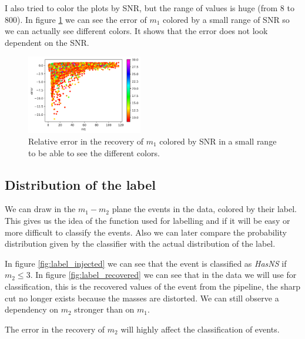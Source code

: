 \documentclass[prd,aps,twocolumn,a4paper,showkeys,nofootinbib]{revtex4-2}
\begin{document}
I also tried to color the plots by SNR, but the range of values is huge (from 8 to 800). In figure \ref{fig:relative_snr} we can see the error of $m_1$ colored by a small range of SNR so we can actually see different colors. It shows that the error does not look dependent on the SNR.

\begin{figure}[]
  \center
  \includegraphics[width=0.45\textwidth]{./FigNS/example_snr}
  \caption{\label{fig:relative_snr} Relative error in the recovery of $m_1$ colored by SNR in a small range to be able to see the different colors.}
\end{figure}

\subsection{Distribution of the label}
We can draw in the $m_1-m_2$ plane the events in the data, colored by their label. This gives us the idea of the function used for labelling and if it will be easy or more difficult to classify the events. Also we can later compare the probability distribution given by the classifier with the actual distribution of the label.

In figure \ref{fig:label_injected} we can see that the event is classified as \textit{HasNS} if $m_2\leq3$.  In figure \ref{fig:label_recovered} we can see that in the data we will use for classification, this is the recovered values of the event from the pipeline, the sharp cut no longer exists because the masses are distorted. We can still observe a dependency on $m_2$ stronger than on $m_1$.

The error in the recovery of $m_2$ will highly affect the classification of events.
\end{document}
